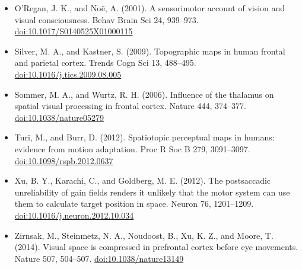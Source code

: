 \documentclass[11pt,a4paper]{article}
\newcommand{\doi}[1]{\href{https://doi.org/#1}{doi:#1}}
\begin{document}
\begin{itemize}[itemsep=1pt,topsep=2pt]
  \item O'Regan, J. K., and No\"e, A. (2001). A sensorimotor account of vision and visual consciousness. Behav Brain Sci 24, 939--973. \doi{10.1017/S0140525X01000115}
  \item Silver, M. A., and Kastner, S. (2009). Topographic maps in human frontal and parietal cortex. Trends Cogn Sci 13, 488--495. \doi{10.1016/j.tics.2009.08.005}
  \item Sommer, M. A., and Wurtz, R. H. (2006). Influence of the thalamus on spatial visual processing in frontal cortex. Nature 444, 374--377. \doi{10.1038/nature05279}
  \item Turi, M., and Burr, D. (2012). Spatiotopic perceptual maps in humans: evidence from motion adaptation. Proc R Soc B 279, 3091--3097. \doi{10.1098/rspb.2012.0637}
  \item Xu, B. Y., Karachi, C., and Goldberg, M. E. (2012). The postsaccadic unreliability of gain fields renders it unlikely that the motor system can use them to calculate target position in space. Neuron 76, 1201--1209. \doi{10.1016/j.neuron.2012.10.034}
  \item Zirnsak, M., Steinmetz, N. A., Noudoost, B., Xu, K. Z., and Moore, T. (2014). Visual space is compressed in prefrontal cortex before eye movements. Nature 507, 504--507. \doi{10.1038/nature13149}
\end{itemize}
\end{document}
